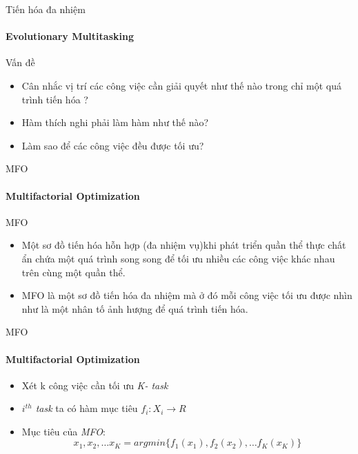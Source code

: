 \documentclass[compress]{beamer}
\begin{document}
\begin{frame}{Tiến hóa đa nhiệm}
\framesubtitle{Evolutionary Multitasking}
\begin{exampleblock}{Vấn đề }
\begin{itemize}
\pause
\item Cân nhắc vị trí các công việc cần giải quyết như thế nào trong chỉ một quá trình tiến hóa ?
\pause
\item Hàm thích nghi phải làm hàm như thế nào? 
\pause
\item Làm sao để các công việc đều được tối ưu?
\end{itemize}
\end{exampleblock}
\end{frame}
\begin{frame}{MFO}
\framesubtitle{Multifactorial Optimization}
\begin{block}{MFO}
\begin{itemize}
\item Một sơ đồ tiến hóa hỗn hợp (đa nhiệm vụ)khi phát triển quần thể  thực chất ẩn chứa một quá trình song song để tối ưu nhiều các công việc khác nhau trên cùng một quần thể.
\pause
\item MFO là một sơ đồ tiến hóa đa nhiệm mà ở đó mỗi công việc tối ưu được nhìn như là một nhân tố ảnh hượng để quá trình tiến hóa.
\end{itemize}
\end{block}
\end{frame}
\begin{frame}{MFO}
\framesubtitle{Multifactorial Optimization}
\begin{itemize}
\item Xét k công việc cần tối ưu \textit{K- task}
\item \textit{$i^{th}$ task} ta có hàm mục tiêu $f_i: X_i \longrightarrow R$
\item Mục tiêu của \textit{MFO}: 
$${x_1, x_2, \ldots x_K}= argmin\{f_1(x_1), f_2(x_2), \ldots f_K(x_K)\}$$
\end{itemize}
\end{frame}
\end{document}
